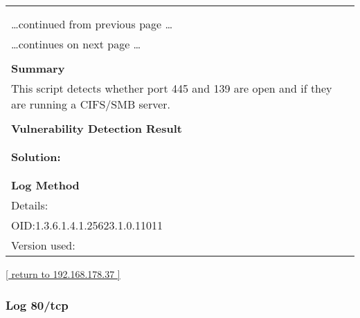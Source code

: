 \documentclass{article}
\begin{document}
\begin{longtable}{|p{}|}
\hline
\rowcolor{gvm_log}{\color{white}{Log (CVSS: 0.0) }}\\
\rowcolor{gvm_log}{\color{white}{NVT: SMB/CIFS Server Detection}}\\
\hline
\endfirsthead
\hfill\ldots continued from previous page \ldots \\
\hline
\endhead
\hline
\ldots continues on next page \ldots \\
\endfoot
\hline
\endlastfoot
\\
\textbf{Summary}\\
This script detects whether port 445 and 139 are open and
  if they are running a CIFS/SMB server.\\

        \hline
        \\
\textbf{Vulnerability Detection Result}\\
\rowcolor{white}{\verb=A SMB server is running on this port=}\\

          \hline
          \\
\textbf{Solution:}\\
\\


        \hline
        \\
\textbf{Log Method}\\
Details:
\rowcolor{white}{\verb=SMB/CIFS Server Detection=}\\
OID:1.3.6.1.4.1.25623.1.0.11011\\
Version used:
\rowcolor{white}{\verb=2020-11-10T15:30:28Z=}\\
\end{longtable}

\begin{footnotesize}\hyperref[host:192.168.178.37]{[ return to 192.168.178.37 ]}\end{footnotesize}
\subsubsection{Log 80/tcp}
\label{port:192.168.178.37 80/tcp Log}
\end{document}

